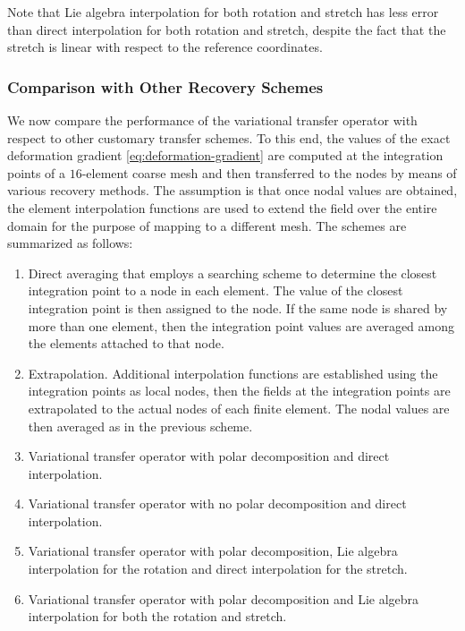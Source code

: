 \documentclass[12pt]{article}
\begin{document}
Note that Lie algebra interpolation for both rotation and stretch has
less error than direct interpolation for both rotation and stretch,
despite the fact that the stretch is linear with respect to the
reference coordinates.

\subsubsection{Comparison with Other Recovery Schemes}
\label{sec:recovery-schemes}

We now compare the performance of the variational transfer operator with respect
to other customary transfer schemes. To this end, the values of the exact
deformation gradient \eqref{eq:deformation-gradient} are computed at the
integration points of a $16$-element coarse mesh and then transferred to the
nodes by means of various recovery methods. The assumption is that once nodal
values are obtained, the element interpolation functions are used to extend the
field over the entire domain for the purpose of mapping to a different mesh. The
schemes are summarized as follows:
\begin{enumerate}
  \item Direct averaging that employs a searching scheme to determine
  the closest integration point to a node in each element. The value
  of the closest integration point is then assigned to the node. If
  the same node is shared by more than one element, then the
  integration point values are averaged among the elements attached to
  that node.
  \item Extrapolation. Additional interpolation functions are
  established using the integration points as local nodes, then the
  fields at the integration points are extrapolated to the actual
  nodes of each finite element. The nodal values are then averaged as
  in the previous scheme.
  \item Variational transfer operator with polar decomposition
  and direct interpolation.
  \item Variational transfer operator with no polar decomposition and
    direct interpolation.
  \item Variational transfer operator with polar decomposition, Lie
    algebra interpolation for the rotation and direct interpolation
    for the stretch.
  \item Variational transfer operator with polar decomposition and Lie
    algebra interpolation for both the rotation and stretch.
\end{enumerate}
\end{document}
